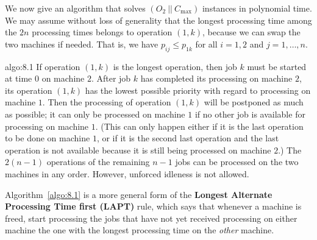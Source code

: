 We now give an algorithm that solves $(O_2~||~C_{\max})$ instances in 
polynomial time. We may assume without loss of generality that the 
longest processing time among the $2n$ processing times belongs to 
operation $(1, k)$, because we can swap the two machines if needed. 
That is, we have $p_{ij} \leq p_{1k}$ for all $i = 1, 2$ and 
$j = 1, \dots, n$. 

\begin{algo}{algo:8.1}
    If operation $(1, k)$ is the longest operation, then job $k$ must be 
    started at time $0$ on machine $2$.
    After job $k$ has completed its processing on machine $2$, 
    its operation $(1, k)$ has the lowest possible priority with 
    regard to processing on machine $1$. Then the processing of 
    operation $(1, k)$ will be postponed as much as possible; 
    it can only be processed on machine $1$ if no other job is 
    available for processing on machine $1$. (This can only 
    happen either if it is the last operation to be done on 
    machine $1$, or if it is the second last operation and the 
    last operation is not available because it is still being 
    processed on machine $2$.) The $2(n-1)$ operations 
    of the remaining $n-1$ jobs can be processed on the two machines 
    in any order. However, unforced idleness is not allowed. 
\end{algo} 

Algorithm~\ref{algo:8.1} is a more general form of the 
{\bf Longest Alternate Processing Time first (LAPT)} rule, which says 
that whenever a machine is freed, start processing the jobs that have 
not yet received processing on either machine the one with the longest 
processing time on the \emph{other} machine. 

